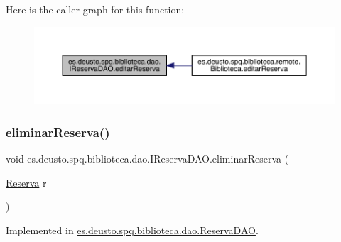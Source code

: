 Here is the caller graph for this function\+:
\nopagebreak
\begin{figure}[H]
\begin{center}
\leavevmode
\includegraphics[width=350pt]{interfacees_1_1deusto_1_1spq_1_1biblioteca_1_1dao_1_1_i_reserva_d_a_o_a0e93c50de1d6d5d81972418b1f5f86bb_icgraph}
\end{center}
\end{figure}
\mbox{\label{interfacees_1_1deusto_1_1spq_1_1biblioteca_1_1dao_1_1_i_reserva_d_a_o_a696cce84b9719e9e858eec9064daa72f}} 
\subsubsection{\texorpdfstring{eliminar\+Reserva()}{eliminarReserva()}}
{\footnotesize\ttfamily void es.\+deusto.\+spq.\+biblioteca.\+dao.\+I\+Reserva\+D\+A\+O.\+eliminar\+Reserva (\begin{DoxyParamCaption}\item[{\mbox{\hyperlink{classes_1_1deusto_1_1spq_1_1biblioteca_1_1data_1_1_reserva}{Reserva}}}]{r }\end{DoxyParamCaption})}



Implemented in \mbox{\hyperlink{classes_1_1deusto_1_1spq_1_1biblioteca_1_1dao_1_1_reserva_d_a_o_a82fb1dbc3f6715103dea1b3bfb3d66b0}{es.\+deusto.\+spq.\+biblioteca.\+dao.\+Reserva\+D\+AO}}.

